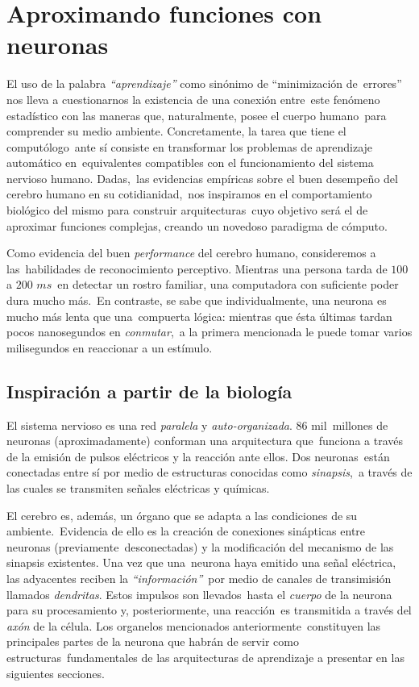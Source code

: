 \section{Aproximando funciones con neuronas}

\noindent
El uso de la palabra \emph{``aprendizaje''} como sinónimo de ``minimización de\
errores'' nos lleva a cuestionarnos la existencia de una conexión entre\
este fenómeno estadístico con las maneras que, naturalmente, posee el cuerpo humano\
para comprender su medio ambiente. Concretamente, la tarea que tiene el computólogo\
ante sí consiste en transformar los problemas de aprendizaje automático en\
equivalentes compatibles con el funcionamiento del sistema nervioso humano. Dadas,\
las evidencias empíricas sobre el buen desempeño del cerebro humano en su cotidianidad,\
nos inspiramos en el comportamiento biológico del mismo para construir arquitecturas\
cuyo objetivo será el de aproximar funciones complejas, creando un novedoso paradigma de cómputo.\par
Como evidencia del buen \emph{performance} del cerebro humano, consideremos a las\
habilidades de reconocimiento perceptivo. Mientras una persona tarda de $100$ a $200$ $ms$\
en detectar un rostro familiar, una computadora con suficiente poder dura mucho más.\cite{haykin2009}\
En contraste, se sabe que individualmente, una neurona es mucho más lenta que una\
compuerta lógica: mientras que ésta últimas tardan pocos nanosegundos en \emph{conmutar},\
a la primera mencionada le puede tomar varios milisegundos en reaccionar a un estímulo.

\subsection{Inspiración a partir de la biología}

\noindent
El sistema nervioso es una red \emph{paralela} y \emph{auto-organizada}. $86$ mil\
millones de neuronas (aproximadamente) \cite{website:nature:scitable} conforman una arquitectura que\
funciona a través de la emisión de pulsos eléctricos y la reacción ante ellos. Dos neuronas\
están conectadas entre sí por medio de estructuras conocidas como \emph{sinapsis},\
a través de las cuales se transmiten señales eléctricas y químicas.\par
El cerebro es, además, un órgano que se adapta a las condiciones de su ambiente.\
Evidencia de ello es la creación de conexiones sinápticas entre neuronas (previamente\
desconectadas) y la modificación del mecanismo de las sinapsis existentes. Una vez que una\
neurona haya emitido una señal eléctrica, las adyacentes reciben la \emph{``información''}\
por medio de canales de transimisión llamados \emph{dendritas}. Estos impulsos son llevados\
hasta el \emph{cuerpo} de la neurona para su procesamiento y, posteriormente, una reacción\
es transmitida a través del \emph{axón} de la célula. Los organelos mencionados anteriormente\
constituyen las principales partes de la neurona que habrán de servir como estructuras\
fundamentales de las arquitecturas de aprendizaje a presentar en las siguientes secciones.\cite{rojas1996}


